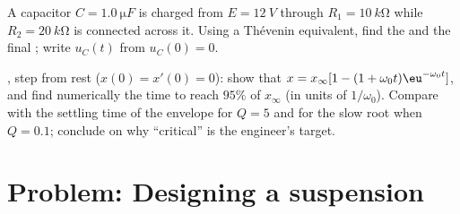 \begin{exercise}[$\star\star\star$]\label{exo:b1:transient-regimes:11}
A capacitor $C = \qty{1.0}{\micro F}$ is charged from $E = \qty{12}{V}$
through $R_1 = \qty{10}{k\ohm}$ while $R_2 = \qty{20}{k\ohm}$ is connected
across it. Using a Thévenin equivalent, find the  and the
final ; write $u_C(t)$ from $u_C(0) = 0$.
\end{exercise}

\begin{exercise}[$\star\star\star$]\label{exo:b1:transient-regimes:12}
, step from rest ($x(0) = x'(0) = 0$): show that
$x = x_\infty[1 - (1 + \omega_0 t)\eu^{-\omega_0 t}]$, and find
numerically the time to reach $95\%$ of $x_\infty$ (in units of
$1/\omega_0$). Compare with the settling time of the envelope for $Q = 5$
and for the slow root when $Q = 0.1$; conclude on why ``critical'' is the
engineer's target.
\end{exercise}

\section{Problem: Designing a suspension}

